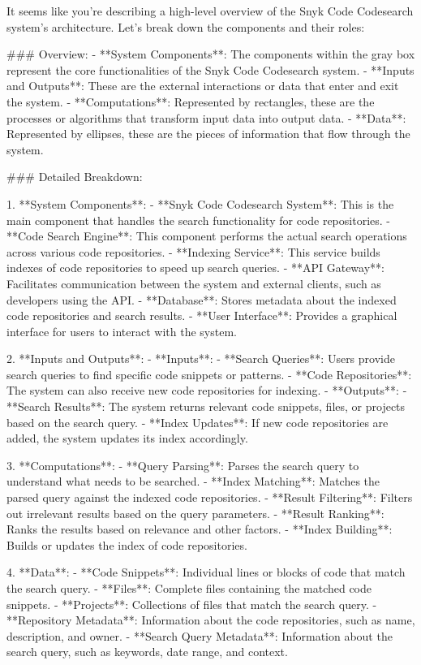 It seems like you're describing a high-level overview of the Snyk Code Codesearch system's architecture. Let's break down the components and their roles:

### Overview:
- **System Components**: The components within the gray box represent the core functionalities of the Snyk Code Codesearch system.
- **Inputs and Outputs**: These are the external interactions or data that enter and exit the system.
- **Computations**: Represented by rectangles, these are the processes or algorithms that transform input data into output data.
- **Data**: Represented by ellipses, these are the pieces of information that flow through the system.

### Detailed Breakdown:

1. **System Components**:
   - **Snyk Code Codesearch System**: This is the main component that handles the search functionality for code repositories.
   - **Code Search Engine**: This component performs the actual search operations across various code repositories.
   - **Indexing Service**: This service builds indexes of code repositories to speed up search queries.
   - **API Gateway**: Facilitates communication between the system and external clients, such as developers using the API.
   - **Database**: Stores metadata about the indexed code repositories and search results.
   - **User Interface**: Provides a graphical interface for users to interact with the system.

2. **Inputs and Outputs**:
   - **Inputs**:
     - **Search Queries**: Users provide search queries to find specific code snippets or patterns.
     - **Code Repositories**: The system can also receive new code repositories for indexing.
   - **Outputs**:
     - **Search Results**: The system returns relevant code snippets, files, or projects based on the search query.
     - **Index Updates**: If new code repositories are added, the system updates its index accordingly.

3. **Computations**:
   - **Query Parsing**: Parses the search query to understand what needs to be searched.
   - **Index Matching**: Matches the parsed query against the indexed code repositories.
   - **Result Filtering**: Filters out irrelevant results based on the query parameters.
   - **Result Ranking**: Ranks the results based on relevance and other factors.
   - **Index Building**: Builds or updates the index of code repositories.

4. **Data**:
   - **Code Snippets**: Individual lines or blocks of code that match the search query.
   - **Files**: Complete files containing the matched code snippets.
   - **Projects**: Collections of files that match the search query.
   - **Repository Metadata**: Information about the code repositories, such as name, description, and owner.
   - **Search Query Metadata**: Information about the search query, such as keywords, date range, and context.


